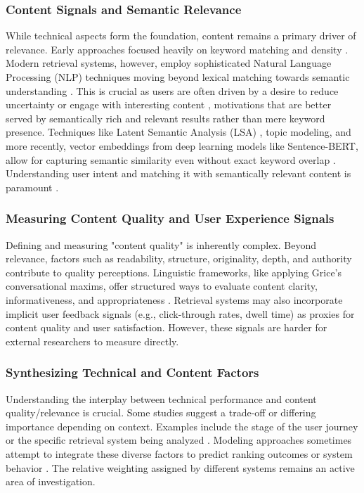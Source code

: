 \documentclass[a4paper,fleqn]{cas-sc}
\begin{document}
\subsubsection{Content Signals and Semantic Relevance}
\label{subsubsec:lit_content}
While technical aspects form the foundation, content remains a primary driver of relevance. Early approaches focused heavily on keyword matching and density \citep{Srinivas2025}. Modern retrieval systems, however, employ sophisticated Natural Language Processing (NLP) techniques moving beyond lexical matching towards semantic understanding \citep{Jindal2014}. This is crucial as users are often driven by a desire to reduce uncertainty or engage with interesting content \citep{vanderSluis2025}, motivations that are better served by semantically rich and relevant results rather than mere keyword presence. Techniques like Latent Semantic Analysis (LSA) \citep{Nagpal2021}, topic modeling, and more recently, vector embeddings from deep learning models like Sentence-BERT, allow for capturing semantic similarity even without exact keyword overlap \citep{Pauzi2023}. Understanding user intent and matching it with semantically relevant content is paramount \citep{Jindal2014, Limongelli2022}.

\subsubsection{Measuring Content Quality and User Experience Signals}
\label{subsubsec:lit_quality}
Defining and measuring "content quality" is inherently complex. Beyond relevance, factors such as readability, structure, originality, depth, and authority contribute to quality perceptions. Linguistic frameworks, like applying Grice's conversational maxims, offer structured ways to evaluate content clarity, informativeness, and appropriateness \citep{Sezerrakolu2024}. Retrieval systems may also incorporate implicit user feedback signals (e.g., click-through rates, dwell time) as proxies for content quality and user satisfaction. However, these signals are harder for external researchers to measure directly.

\subsubsection{Synthesizing Technical and Content Factors}
\label{subsubsec:lit_synthesis}
Understanding the interplay between technical performance and content quality/relevance is crucial. Some studies suggest a trade-off or differing importance depending on context. Examples include the stage of the user journey \citep{Nagpal2021} or the specific retrieval system being analyzed \citep{Toms2004}. Modeling approaches sometimes attempt to integrate these diverse factors to predict ranking outcomes or system behavior \citep{Jayaraman2022}. The relative weighting assigned by different systems remains an active area of investigation.
\end{document}
